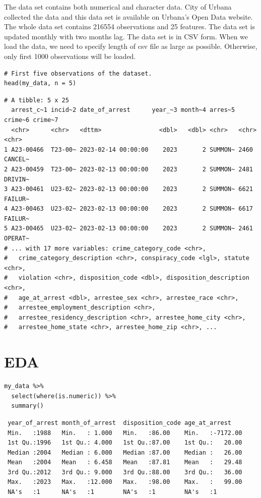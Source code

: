 \documentclass[
  article]{jss}
\begin{document}
The data set contains both numerical and character data. City of Urbana
collected the data and this data set is available on Urbana's Open Data
website. The whole data set contains 216554 observations and 25
features. The data set is updated monthly with two months lag. The data
set is in CSV form. When we load the data, we need to specify length of
csv file as large as possible. Otherwise, only first 1000 observations
will be loaded.

\begin{verbatim}
# First five observations of the dataset. 
head(my_data, n = 5)
\end{verbatim}

\begin{verbatim}
# A tibble: 5 x 25
  arrest_c~1 incid~2 date_of_arrest      year_~3 month~4 arres~5 crime~6 crime~7
  <chr>      <chr>   <dttm>                <dbl>   <dbl> <chr>   <chr>   <chr>  
1 A23-00466  T23-00~ 2023-02-14 00:00:00    2023       2 SUMMON~ 2460    CANCEL~
2 A23-00459  T23-00~ 2023-02-13 00:00:00    2023       2 SUMMON~ 2481    DRIVIN~
3 A23-00461  U23-02~ 2023-02-13 00:00:00    2023       2 SUMMON~ 6621    FAILUR~
4 A23-00463  U23-02~ 2023-02-13 00:00:00    2023       2 SUMMON~ 6617    FAILUR~
5 A23-00465  U23-02~ 2023-02-13 00:00:00    2023       2 SUMMON~ 2461    OPERAT~
# ... with 17 more variables: crime_category_code <chr>,
#   crime_category_description <chr>, conspiracy_code <lgl>, statute <chr>,
#   violation <chr>, disposition_code <dbl>, disposition_description <chr>,
#   age_at_arrest <dbl>, arrestee_sex <chr>, arrestee_race <chr>,
#   arrestee_employment_description <chr>,
#   arrestee_residency_description <chr>, arrestee_home_city <chr>,
#   arrestee_home_state <chr>, arrestee_home_zip <chr>, ...
\end{verbatim}

\hypertarget{eda}{%
\section{EDA}\label{eda}}

\begin{verbatim}
my_data %>%
  select(where(is.numeric)) %>% 
  summary()
\end{verbatim}

\begin{verbatim}
 year_of_arrest month_of_arrest  disposition_code age_at_arrest     
 Min.   :1988   Min.   : 1.000   Min.   :86.00    Min.   :-7172.00  
 1st Qu.:1996   1st Qu.: 4.000   1st Qu.:87.00    1st Qu.:   20.00  
 Median :2004   Median : 6.000   Median :87.00    Median :   26.00  
 Mean   :2004   Mean   : 6.458   Mean   :87.81    Mean   :   29.48  
 3rd Qu.:2012   3rd Qu.: 9.000   3rd Qu.:88.00    3rd Qu.:   36.00  
 Max.   :2023   Max.   :12.000   Max.   :98.00    Max.   :   99.00  
 NA's   :1      NA's   :1        NA's   :1        NA's   :1         
\end{verbatim}
\end{document}
